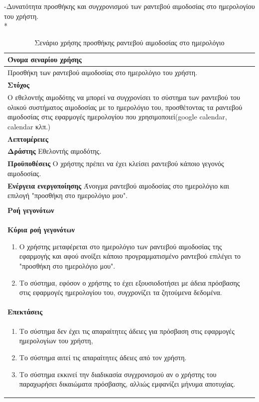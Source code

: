 -Δυνατότητα προσθήκης και συγχρονισμού των ραντεβού αιμοδοσίας στο ημερολογίου του χρήστη.
\\*
\begin{table}[H]
	\begin{center}
	    \begin{tabular}{|p{\dimexpr \linewidth-2\tabcolsep}|}
	    \hline
	    \rowcolor{grayy}
	    \textbf{Όνομα σεναρίου χρήσης}
	    \\ \hline    
	    Προσθήκη των ραντεβού αιμοδοσίας στο ημερολόγιο του χρήστη.
	     \\ \hline
	    \rowcolor{grayy}
	    \textbf{\textbf{Στόχος}}
	    \\ \hline
	 	 Ο εθελοντής αιμοδότης να μπορεί να συγχρονίσει το σύστημα των ραντεβού του ολικού συστήματος αιμοδοσίας με το ημερολόγιο του, προσθέτοντας τα  ραντεβού αιμοδοσίας στις εφαρμογές ημερολογίου που χρησιμοποιεί(google calendar, calendar κλπ.)
	    \\ \hline
	    \rowcolor{grayy}
	    \textbf{Λεπτομέρειες}
	    \\ \hline
		\textbf{Δράστης} Εθελοντής αιμοδότης.
		\\*
		\textbf{Προϋποθέσεις} Ο χρήστης πρέπει να έχει κλείσει ραντεβού κάποιο γεγονός αιμοδοσίας.
		\\*
		\textbf{Ενέργεια ενεργοποίησης} Άνοιγμα ραντεβού αιμοδοσίας  στο ημερολόγιο και επιλογή "προσθήκη στο ημερολόγιο μου".
		\\ \hline
	    \\ \hline
		\rowcolor{grayy}    
	    \textbf{Ροή γεγονότων}
	    \\* 
		\textbf{Κύρια ροή γεγονότων}
		\begin{enumerate}
		\item	 Ο χρήστης μεταφέρεται στο ημερολόγιο των ραντεβού αιμοδοσίας της εφαρμογής και αφού ανοίξει κάποιο προγραμματισμένο ραντεβού επιλέγει το "προσθήκη στο ημερολόγιο μου".
		\item  Το σύστημα, εφόσον ο χρήστης το έχει εξουσιοδοτήσει με άδεια πρόσβασης στις εφαρμογές ημερολογίου του, συγχρονίζει τα ζητούμενα δεδομένα.
		\end{enumerate}
		\\*
		\textbf{Επεκτάσεις}
		   \\ \hline
		\begin{enumerate}
			\item Το σύστημα δεν έχει τις απαραίτητες άδειες για πρόσβαση στις εφαρμογές ημερολογίων του χρήστη,
			\item Το σύστημα αιτεί τις απαραίτητες άδειες από τον χρήστη.
			\item Το σύστημα εκκινεί την διαδικασία συγχρονισμού αν ο χρήστης του παραχωρήσει δικαιώματα πρόσβασης, αλλιώς εμφανίζει μήνυμα αποτυχίας.
		\end{enumerate}
		\\ \hline
	    \end{tabular}
	    \caption{Σενάριο χρήσης προσθήκης ραντεβού αιμοδοσίας στο ημερολόγιο}
	    \label{tab:add_blood_donation_to_calendar}
	\end{center}
\end{table}	
		
